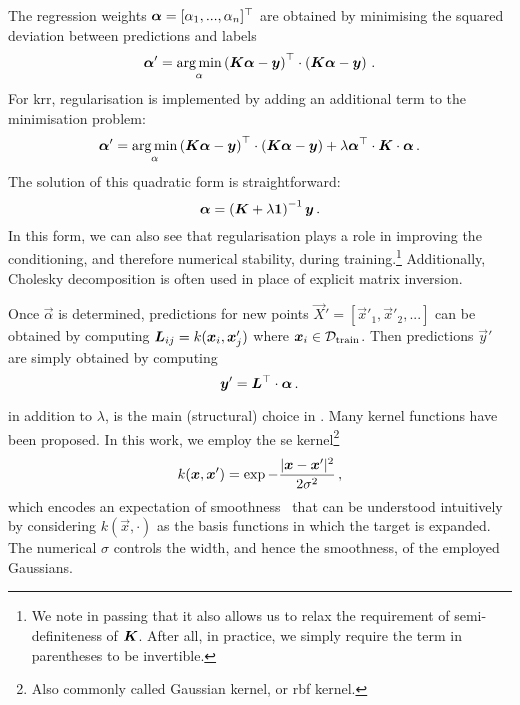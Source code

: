 The regression weights $\boldsymbol{\alpha} = [\alpha_1,...,\alpha_n]^\top$ are obtained by minimising the squared deviation between predictions and labels
\begin{equation}
	\boldsymbol{\alpha}' = \operatorname*{arg\,min}_{\alpha} \left(\boldsymbol{K} \boldsymbol{\alpha} - \boldsymbol{y}\right)^\top \cdot \left(\boldsymbol{K} \boldsymbol{\alpha} - \boldsymbol{y}\right) \, .
\end{equation}
For \gls{krr}, regularisation is implemented by adding an additional term to the minimisation problem:
\begin{equation}
	\vec{\alpha}' = \argmin_{\alpha} \left(\mat{K} \vec{\alpha} - \vec{y}\right)^\transpose \cdot \left(\mat{K} \vec{\alpha} - \vec{y}\right) + \lambda \vec{\alpha}^\transpose \cdot \mat{K} \cdot \vec{\alpha} \, .\label{eq:ml-krr_regloss}
\end{equation}
The solution of this quadratic form is straightforward:
\begin{equation}
	\boldsymbol{\alpha} = \left(\boldsymbol{K} + \lambda {\bf 1} \right)^{-1} \boldsymbol{y} \, .
\end{equation}
In this form, we can also see that regularisation plays a role in improving the conditioning, and therefore numerical stability, during training.\footnote[][-1\baselineskip]{We note in passing that it also allows us to relax the requirement of semi-definiteness of $\boldsymbol{K}$. After all, in practice, we simply require the term in parentheses to be invertible.} Additionally, Cholesky decomposition is often used in place of explicit matrix inversion.

Once $\vec{\alpha}$ is determined, predictions for new points $\vec{X}' = [\vec{x}'_1, \vec{x}'_2, ...]$ can be obtained by computing $\boldsymbol{L}_{ij} = k(\boldsymbol{x}_i, \boldsymbol{x}'_j)$ where $\boldsymbol{x}_i \in \mathcal{D}_{\text{train}}$. Then predictions $\vec{y}'$ are simply obtained by computing
\begin{equation}
	\boldsymbol{y}' = \boldsymbol{L}^\top \cdot \boldsymbol{\alpha} \, .
\end{equation}

 in addition to $\lambda$, is the main (structural) \hp choice in \krr. Many kernel functions have been proposed. In this work, we employ the \gls{se} kernel\footnote{Also commonly called Gaussian kernel, or \gls{rbf} kernel.}
\begin{equation}
	k(\boldsymbol{x}, \boldsymbol{x}') = \exp{-\frac{|\boldsymbol{x} - \boldsymbol{x}'|^2}{2 \sigma^2}} \, ,
\end{equation}
which encodes an expectation of smoothness~\cite{ssm1998Am} that can be understood intuitively by considering $k(\vec{x}, \cdot)$ as the basis functions in which the target is expanded. The numerical \hp $\sigma$ controls the width, and hence the smoothness, of the employed Gaussians.

